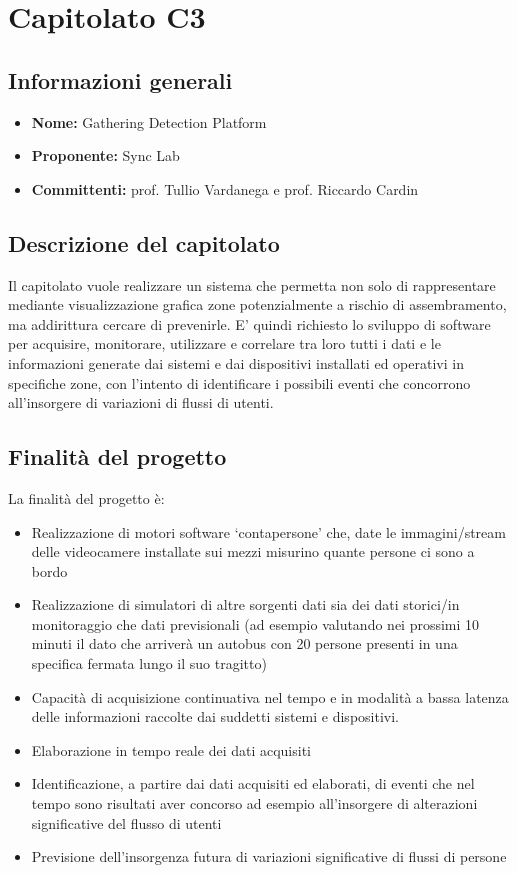 \section{Capitolato C3}

\subsection{Informazioni generali}
\begin{itemize}
\item \textbf{Nome:}  Gathering Detection Platform 
\item \textbf{Proponente:} Sync Lab 
\item \textbf{Committenti:} prof. Tullio Vardanega e prof. Riccardo Cardin
\end{itemize}

\subsection{Descrizione del capitolato}
Il capitolato vuole realizzare un sistema che permetta non solo di rappresentare mediante visualizzazione grafica zone potenzialmente a rischio di assembramento, ma addirittura cercare di prevenirle. E' quindi richiesto lo sviluppo di software per acquisire, monitorare, utilizzare e correlare tra loro tutti i dati e le informazioni generate dai sistemi e dai dispositivi installati ed operativi in specifiche zone, con l’intento di identificare i possibili eventi che concorrono all’insorgere di variazioni di flussi di utenti. 
\subsection{Finalità del progetto}
La finalità del progetto è:
\begin{itemize}
\item Realizzazione di motori software ‘contapersone’ che, date le immagini/stream delle videocamere installate sui mezzi misurino quante persone ci sono a bordo
\item Realizzazione di simulatori di altre sorgenti dati sia dei dati storici/in monitoraggio che dati previsionali
(ad esempio valutando nei prossimi 10 minuti il dato che arriverà un autobus con 20 persone presenti
in una specifica fermata lungo il suo tragitto)
\item Capacità di acquisizione continuativa nel tempo e in modalità a bassa latenza delle informazioni
raccolte dai suddetti sistemi e dispositivi.
\item Elaborazione in tempo reale dei dati acquisiti
\item Identificazione, a partire dai dati acquisiti ed elaborati, di eventi che nel tempo sono risultati aver
concorso ad esempio all’insorgere di alterazioni significative del flusso di utenti
\item Previsione dell’insorgenza futura di variazioni significative di flussi di persone
\end{itemize}

